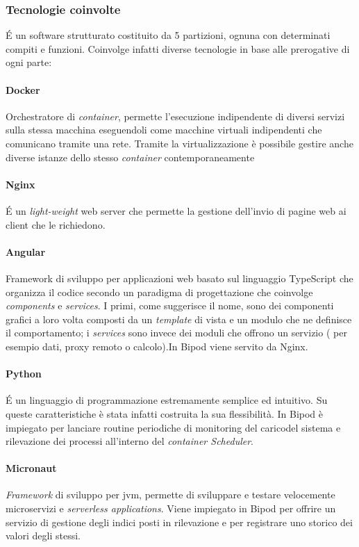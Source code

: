 \subsubsection{Tecnologie coinvolte}
\'E un software strutturato costituito da 5 partizioni, ognuna con determinati compiti e funzioni. Coinvolge infatti diverse tecnologie in base alle prerogative di ogni parte:

\paragraph{Docker} Orchestratore di \textit{container}, permette l'esecuzione indipendente di diversi servizi sulla stessa macchina eseguendoli come macchine virtuali indipendenti che comunicano tramite una rete. Tramite la virtualizzazione è possibile gestire anche diverse istanze dello stesso \textit{container} contemporaneamente

\paragraph{Nginx} \'E un \textit{light-weight} web server che permette la gestione dell'invio di pagine web ai client che le richiedono.

\paragraph{Angular} Framework di sviluppo per applicazioni web basato sul linguaggio TypeScript che organizza il codice secondo un paradigma di progettazione che coinvolge \textit{components} e \textit{services}. I primi, come suggerisce il nome, sono dei componenti grafici a loro volta composti da un \textit{template} di vista e un modulo che ne definisce il comportamento; i \textit{services} sono invece dei moduli che offrono un servizio ( per esempio dati, proxy remoto o calcolo).In Bipod viene servito da Nginx.

\paragraph{Python} \'E un linguaggio di programmazione estremamente semplice ed intuitivo. Su queste caratteristiche è stata infatti costruita la sua flessibilità. In Bipod è impiegato per lanciare routine periodiche di monitoring del caricodel sistema e rilevazione dei processi all'interno del \textit{container Scheduler}.

\paragraph{Micronaut} \textit{Framework} di sviluppo per \acrshort{jvm}, permette di sviluppare e testare velocemente microservizi e \textit{serverless applications}. Viene impiegato in Bipod per offrire un servizio di gestione degli indici posti in rilevazione e per registrare uno storico dei valori degli stessi.

